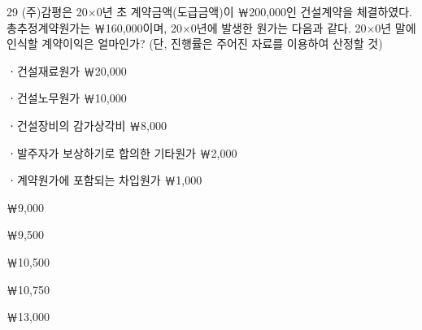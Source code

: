 \begin{question}{29}
(주)감평은 20×0년 초 계약금액(도급금액)이 ￦200,000인 건설계약을 체결하였다. 총추정계약원가는 ￦160,000이며, 20×0년에 발생한 원가는 다음과 같다. 20×0년 말에 인식할 계약이익은 얼마인가? (단, 진행률은 주어진 자료를 이용하여 산정할 것)
\begin{framedtext}
ㆍ건설재료원가 ￦20,000 \par
ㆍ건설노무원가 ￦10,000 \par
ㆍ건설장비의 감가상각비 ￦8,000 \par
ㆍ발주자가 보상하기로 합의한 기타원가 ￦2,000 \par
ㆍ계약원가에 포함되는 차입원가 ￦1,000 \par
\end{framedtext}
\begin{choices}
  \item ￦9,000
  \item ￦9,500
  \item ￦10,500
  \item ￦10,750
  \item ￦13,000
\end{choices}
\end{question}
\answerall
{}
